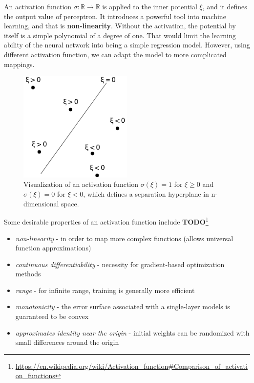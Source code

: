 An activation function $\sigma: \mathbb{R} \rightarrow \mathbb{R}$ is applied to the inner potential $\xi$, and it defines the output value of perceptron. It introduces a powerful tool into machine learning, and that is \textbf{non-linearity}. Without the activation, the potential by itself is a simple polynomial of a degree of one. That would limit the learning ability of the neural network into being a simple regression model. However, using different activation function, we can adapt the model to more complicated mappings.

\begin{figure}[h]

\centering
\includegraphics[width=0.5\textwidth]{tex/images/activation-vis}
\caption{Visualization of an activation function $\sigma(\xi) = 1$ for $\xi \geq 0$ and $\sigma(\xi) = 0$ for $\xi < 0$, which defines a separation hyperplane in n-dimensional space.}
\end{figure}

Some desirable properties of an activation function include \textbf{TODO}\footnote{\url{https://en.wikipedia.org/wiki/Activation_function\#Comparison_of_activation_functions}}

\begin{itemize}

\item \textit{non-linearity} - in order to map more complex functions (allows universal function approximations)
\item \textit{continuous differentiability} - necessity for gradient-based optimization methods
\item \textit{range} - for infinite range, training is generally more efficient
\item \textit{monotonicity} - the error surface associated with a single-layer models is guaranteed to be convex
\item \textit{approximates identity near the origin} - initial weights can be randomized with small differences around the origin

\end{itemize}

